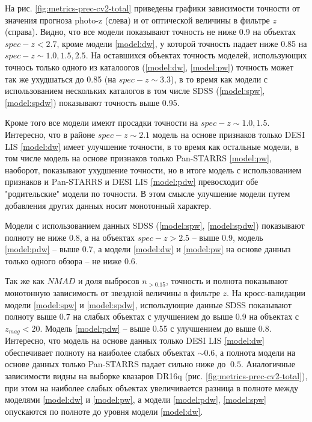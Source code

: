 \documentclass[fleqn,usenatbib]{mnras}
\begin{document}
На рис. \ref{fig:metrics-prec-cv2-total} приведены графики зависимости точности от значения прогноза photo-z (слева) и от оптической величины в фильтре $z$ (справа). Видно, что все модели показывают точность не ниже 0.9 на объектах $spec-z < 2.7$, кроме модели \ref{model:dw}, у которой точность падает ниже 0.85 на $spec-z \sim 1.0, 1.5, 2.5$. На оставшихся объектах точность моделей, использующих точнось только одного из каталоогов (\ref{model:dw}, \ref{model:pw}) точность может так же ухудшаться до 0.85 (на $spec-z \sim 3.3$), в то время как модели с использованием нескольких каталогов в том числе SDSS (\ref{model:spw}, \ref{model:spdw}) показывают точность выше 0.95.

Кроме того все модели имеют просадки точности на $spec-z \sim 1.0, 1.5$. Интересно, что в районе $spec-z \sim 2.1$ модель на основе признаков только DESI LIS \ref{model:dw} имеет улучшение точности, в то время как остальные модели, в том числе модель на основе признаков только Pan-STARRS \ref{model:pw}, наоборот, показывают ухудшение точности, но в итоге модель с использованием признаков и Pan-STARRS и DESI LIS \ref{model:pdw} превосходит обе "родительские" модели по точности. В этом смысле улучшение модели путем добавления других данных носит монотонный характер.

Модели с использованием данных SDSS (\ref{model:spw}, \ref{model:spdw}) показывают полноту не ниже 0.8, а на объектах $spec-z > 2.5$ -- выше 0.9, модель \ref{model:pdw} -- выше 0.7, а модели \ref{model:dw} и \ref{model:pw} на основе данныз только одного обзора -- не ниже 0.6.

Так же как $NMAD$ и доля выбросов $n_{>0.15}$, точность и полнота показывают монотонную зависимость от звездной величины в фильтре $z$. На кросс-валидации модели \ref{model:spw} и \ref{model:spdw}, использующие данные SDSS показывают полноту выше 0.7 на слабых объектах с улучшением до выше 0.9 на объектах с $z_{mag} < 20$. Модель \ref{model:pdw} -- выше 0.55 с улучшением до выше 0.8. Интересно, что модель на основе данных только DESI LIS \ref{model:dw} обеспечивает полноту на наиболее слабых объектах $\sim 0.6$, а полнота модели на основе данных только Pan-STARRS падает сильно ниже до $~0.5$. Аналогичные зависимости видны на выборке квазаров DR16q (рис. \ref{fig:metrics-prec-cv2-total}), при этом на наиболее слабых объектах увеличивается разница в полноте между моделями \ref{model:dw} и \ref{model:pw}, а модели \ref{model:pdw}, \ref{model:spw} опускаются по полноте до уровня модели \ref{model:dw}.
\end{document}

